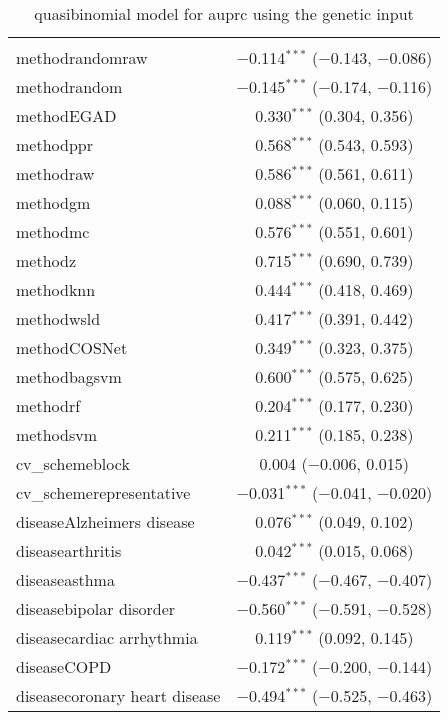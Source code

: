 
\begin{table}[!htbp] \centering 
  \caption{quasibinomial model for auprc using the genetic input} 
  \label{} 
\begin{tabular}{@{\extracolsep{5pt}}lc} 
\\[-1.8ex]\hline 
\hline \\[-1.8ex] 
 methodrandomraw & $-$0.114$^{***}$ ($-$0.143, $-$0.086) \\ 
  methodrandom & $-$0.145$^{***}$ ($-$0.174, $-$0.116) \\ 
  methodEGAD & 0.330$^{***}$ (0.304, 0.356) \\ 
  methodppr & 0.568$^{***}$ (0.543, 0.593) \\ 
  methodraw & 0.586$^{***}$ (0.561, 0.611) \\ 
  methodgm & 0.088$^{***}$ (0.060, 0.115) \\ 
  methodmc & 0.576$^{***}$ (0.551, 0.601) \\ 
  methodz & 0.715$^{***}$ (0.690, 0.739) \\ 
  methodknn & 0.444$^{***}$ (0.418, 0.469) \\ 
  methodwsld & 0.417$^{***}$ (0.391, 0.442) \\ 
  methodCOSNet & 0.349$^{***}$ (0.323, 0.375) \\ 
  methodbagsvm & 0.600$^{***}$ (0.575, 0.625) \\ 
  methodrf & 0.204$^{***}$ (0.177, 0.230) \\ 
  methodsvm & 0.211$^{***}$ (0.185, 0.238) \\ 
  cv\_schemeblock & 0.004 ($-$0.006, 0.015) \\ 
  cv\_schemerepresentative & $-$0.031$^{***}$ ($-$0.041, $-$0.020) \\ 
  diseaseAlzheimers disease & 0.076$^{***}$ (0.049, 0.102) \\ 
  diseasearthritis & 0.042$^{***}$ (0.015, 0.068) \\ 
  diseaseasthma & $-$0.437$^{***}$ ($-$0.467, $-$0.407) \\ 
  diseasebipolar disorder & $-$0.560$^{***}$ ($-$0.591, $-$0.528) \\ 
  diseasecardiac arrhythmia & 0.119$^{***}$ (0.092, 0.145) \\ 
  diseaseCOPD & $-$0.172$^{***}$ ($-$0.200, $-$0.144) \\ 
  diseasecoronary heart disease & $-$0.494$^{***}$ ($-$0.525, $-$0.463) \\ 

\end{tabular}
\end{table}
